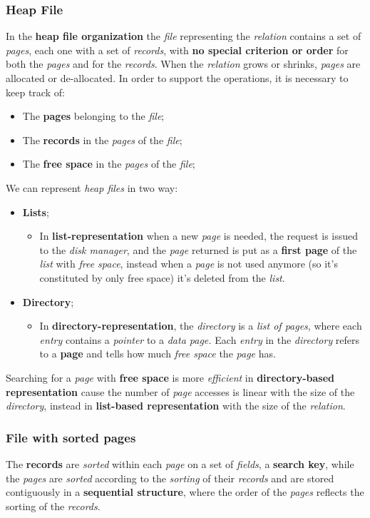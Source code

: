\documentclass{article}
\begin{document}
\subsubsection{Heap File}
In the \textbf{heap file organization} the \emph{file} representing the \emph{relation} contains a set of \emph{pages}, each one with a set of \emph{records}, with \textbf{no special criterion or order} for both the \emph{pages} and for the \emph{records}. When the \emph{relation} grows or shrinks, \emph{pages} are allocated or de-allocated. In order to support the operations, it is necessary to keep track of:
\begin{itemize}
\item The \textbf{pages} belonging to the \emph{file};
\item The \textbf{records} in the \emph{pages} of the \emph{file};
\item The\textbf{ free space} in the \emph{pages} of the \emph{file};
\end{itemize}
\clearpage
We can represent \emph{heap files} in two way:
\begin{itemize}
\item \textbf{Lists};
\begin{itemize}
\item In \textbf{list-representation} when a new \emph{page} is needed, the request is issued to the \emph{disk manager}, and the \emph{page} returned is put as a \textbf{first page} of the \emph{list} with \emph{free space}, instead when a \emph{page} is not used anymore (so it's constituted by only free space) it's deleted from the \emph{list}.
\end{itemize}
\item \textbf{Directory};
\begin{itemize}
\item In \textbf{directory-representation}, the \emph{directory} is a \emph{list of pages}, where each \emph{entry} contains a \emph{pointer} to a \emph{data page.} Each \emph{entry} in the \emph{directory} refers to a \textbf{page} and tells how much \emph{free space} the \emph{page} has.
\end{itemize}
\end{itemize}
Searching for a \emph{page} with \textbf{free space} is more \emph{efficient} in \textbf{directory-based representation} cause the number of \emph{page} accesses is linear with the size of the \emph{directory}, instead in \textbf{list-based representation} with the size of the \emph{relation}. 
\subsubsection{File with sorted pages}
The \textbf{records} are \emph{sorted} within each \emph{page} on a set of \emph{fields}, a \textbf{search key}, while the \emph{pages} are \emph{sorted} according to the \emph{sorting} of their \emph{records} and are stored contiguously in a \textbf{sequential structure}, where the order of the \emph{pages} reflects the sorting of the \emph{records}. 
\end{document}
